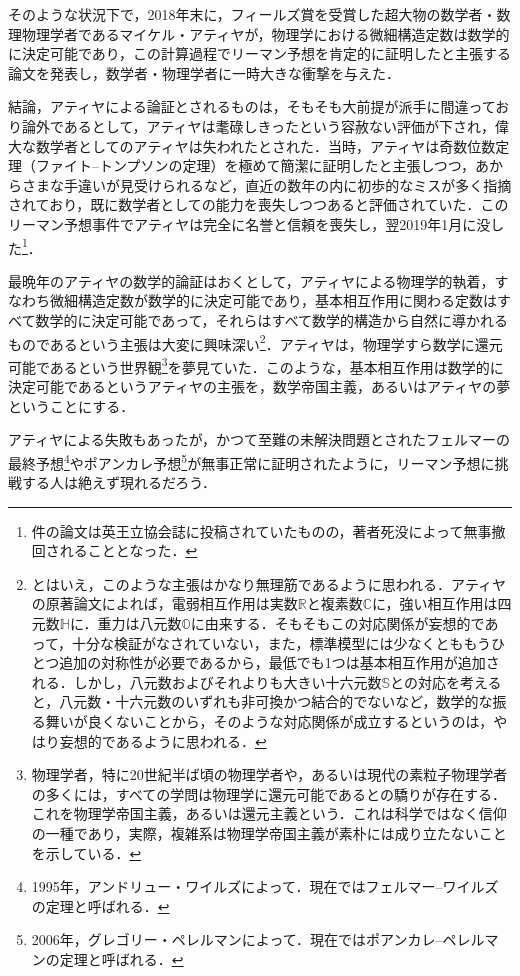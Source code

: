 \documentclass[10pt, a5paper, twoside]{jsarticle}
\theoremstyle{definition}
\begin{document}
                そのような状況下で，2018年末に，フィールズ賞を受賞した超大物の数学者・数理物理学者であるマイケル・アティヤが，物理学における微細構造定数は数学的に決定可能であり，この計算過程でリーマン予想を肯定的に証明したと主張する論文\cite{aty1, aty2}を発表し，数学者・物理学者に一時大きな衝撃を与えた．

                結論，アティヤによる論証とされるものは，そもそも大前提が派手に間違っており論外であるとして，アティヤは耄碌しきったという容赦ない評価が下され，偉大な数学者としてのアティヤは失われたとされた．当時，アティヤは奇数位数定理（ファイト--トンプソンの定理）を極めて簡潔に証明したと主張しつつ，あからさまな手違いが見受けられるなど，直近の数年の内に初歩的なミスが多く指摘されており，既に数学者としての能力を喪失しつつあると評価されていた．このリーマン予想事件でアティヤは完全に名誉と信頼を喪失し，翌2019年1月に没した\footnote{件の論文は英王立協会誌に投稿されていたものの，著者死没によって無事撤回されることとなった．}．

                最晩年のアティヤの数学的論証はおくとして，アティヤによる物理学的執着，すなわち微細構造定数が数学的に決定可能であり，基本相互作用に関わる定数はすべて数学的に決定可能であって，それらはすべて数学的構造から自然に導かれるものであるという主張は大変に興味深い\footnote{とはいえ，このような主張はかなり無理筋であるように思われる．アティヤの原著論文\cite{aty1}によれば，電弱相互作用は実数$\mathbb{R}$と複素数$\mathbb{C}$に，強い相互作用は四元数$\mathbb{H}$に．重力は八元数$\mathbb{O}$に由来する．そもそもこの対応関係が妄想的であって，十分な検証がなされていない，また，標準模型には少なくとももうひとつ追加の対称性が必要であるから，最低でも1つは基本相互作用が追加される．しかし，八元数およびそれよりも大きい十六元数$\mathbb{S}$との対応を考えると，八元数・十六元数のいずれも非可換かつ結合的でないなど，数学的な振る舞いが良くないことから，そのような対応関係が成立するというのは，やはり妄想的であるように思われる．}．アティヤは，物理学すら数学に還元可能であるという世界観\footnote{物理学者，特に20世紀半ば頃の物理学者\cite{hsy}や，あるいは現代の素粒子物理学者の多くには，すべての学問は物理学に還元可能であるとの驕りが存在する．これを物理学帝国主義，あるいは還元主義という．これは科学ではなく信仰の一種であり，実際，複雑系は物理学帝国主義が素朴には成り立たないことを示している．}を夢見ていた．このような，基本相互作用は数学的に決定可能であるというアティヤの主張を，数学帝国主義，あるいはアティヤの夢ということにする．

                アティヤによる失敗もあったが，かつて至難の未解決問題とされたフェルマーの最終予想\footnote{1995年，アンドリュー・ワイルズによって．現在ではフェルマー--ワイルズの定理と呼ばれる．}やポアンカレ予想\footnote{2006年，グレゴリー・ペレルマンによって．現在ではポアンカレ--ペレルマンの定理と呼ばれる．}が無事正常に証明されたように，リーマン予想に挑戦する人は絶えず現れるだろう．
\end{document}

